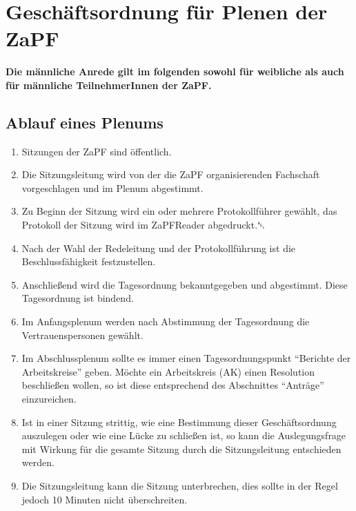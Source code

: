\documentclass[draft,12pt,oneside]{scrreprt}
\begin{document}
\chapter*{Geschäftsordnung für Plenen der ZaPF}

\textbf{Die männliche Anrede gilt im folgenden sowohl für weibliche als auch für
männliche TeilnehmerInnen der ZaPF.}

\section{Ablauf eines Plenums}

\begin{enumerate}
  \item Sitzungen der ZaPF sind öffentlich.

  \item Die Sitzungsleitung wird von der die ZaPF organisierenden Fachschaft
        vorgeschlagen und im Plenum abgestimmt.

  \item Zu Beginn der Sitzung wird ein oder mehrere Protokollführer gewählt,
        das Protokoll der Sitzung wird im ZaPFReader abgedruckt.␇

  \item Nach der Wahl der Redeleitung und der Protokollführung ist die
        Beschlussfähigkeit festzustellen.

  \item Anschließend wird die Tagesordnung bekanntgegeben und abgestimmt.
        Diese Tagesordnung ist bindend.

  \item Im Anfangsplenum werden nach Abstimmung der Tagesordnung die
        Vertrauenspersonen gewählt.

  \item Im Abschlussplenum sollte es immer einen Tagesordnungspunkt ``Berichte
        der Arbeitskreise'' geben.
        Möchte ein Arbeitskreis (AK) einen Resolution beschließen wollen, so
        ist diese entsprechend des Abschnittes ``Anträge'' einzureichen.

  \item Ist in einer Sitzung strittig, wie eine Bestimmung dieser Geschäftsordnung
        auszulegen oder wie eine Lücke zu schließen ist, so kann die Auslegungsfrage
        mit Wirkung für die gesamte Sitzung durch die Sitzungsleitung entschieden
        werden.

  \item Die Sitzungsleitung kann die Sitzung unterbrechen, dies sollte in der
        Regel jedoch 10 Minuten nicht überschreiten.
\end{enumerate}
\end{document}
